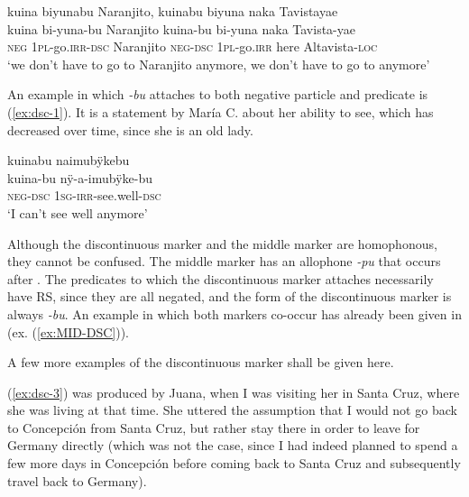 \ea\label{ex:DSCnew-1}
\begingl
\glpreamble kuina biyunabu Naranjito, kuinabu biyuna naka Tavistayae\\
\gla kuina bi-yuna-bu Naranjito kuina-bu bi-yuna naka Tavista-yae\\
\glb \textsc{neg} 1\textsc{pl}-go.\textsc{irr}-\textsc{dsc} Naranjito \textsc{neg}-\textsc{dsc} 1\textsc{pl}-go.\textsc{irr} here Altavista-\textsc{loc}\\
\glft ‘we don’t have to go to Naranjito anymore, we don’t have to go to  anymore’
\endgl
\trailingcitation{[jxx-p120515l-2.207-208]}
\xe

An example in which \textit{-bu} attaches to both negative particle and predicate is (\ref{ex:dsc-1}). It is a statement by María C. about her ability to see, which has decreased over time, since she is an old lady.

\ea\label{ex:dsc-1}
\begingl 
\glpreamble kuinabu naimubÿkebu\\
\gla kuina-bu nÿ-a-imubÿke-bu\\ 
\glb \textsc{neg}-\textsc{dsc} 1\textsc{sg}-\textsc{irr}-see.well-\textsc{dsc}\\ 
\glft ‘I can’t see well anymore’
\trailingcitation{[uxx-p110825l.013]}
\xe


Although the discontinuous marker and the middle marker are homophonous, they cannot be confused. The middle marker has an allophone \textit{-pu} that occurs after . The predicates to which the discontinuous marker attaches necessarily have  RS, since they are all negated, and the form of the discontinuous marker is always \textit{-bu}. An example in which both markers co-occur has already been given in  (ex. (\ref{ex:MID-DSC})).

A few more examples of the discontinuous marker shall be given here.

(\ref{ex:dsc-3}) was produced by Juana, when I was visiting her in Santa Cruz, where she was living at that time. She uttered the assumption that I would not go back to Concepción from Santa Cruz, but rather stay there in order to leave for Germany directly (which was not the case, since I had indeed planned to spend a few more days in Concepción before coming back to Santa Cruz and subsequently travel back to Germany).

